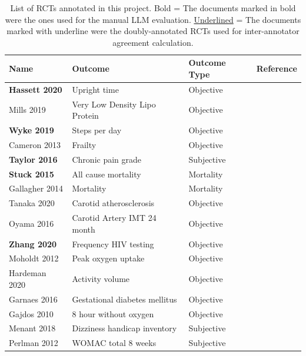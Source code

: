 \documentclass[sn-mathphys,Numbered]{sn-jnl}%
\begin{document}
\begin{longtable}{|p{3cm}|p{3.5cm}|p{3cm}|p{1.7cm}|}
\caption{List of RCTs annotated in this project. Bold = The documents marked in bold were the ones used for the manual LLM evaluation. \underline{Underlined} = The documents marked with underline were the doubly-annotated RCTs used for inter-annotator agreement calculation.}\label{tab1}
\hline
\textbf{Name} & \textbf{Outcome} & \textbf{Outcome Type} & \textbf{Reference} \\
\hline
\endhead %

\hline
\textbf{Hassett 2020} & Upright time & Objective & \cite{hassett2020digitally} \\
\hline
Mills 2019 & Very Low Density Lipo Protein & Objective & \cite{mills2019effect} \\
\hline
\textbf{Wyke 2019} & Steps per day & Objective & \cite{wyke2019effect} \\
\hline
Cameron 2013 & Frailty & Objective & \cite{cameron2013multifactorial} \\
\hline
\textbf{Taylor 2016} & Chronic pain grade & Subjective & \cite{taylor2016novel} \\
\hline
\textbf{Stuck 2015} & All cause mortality & Mortality & \cite{stuck2015effect} \\
\hline
Gallagher 2014 & Mortality & Mortality & \cite{gallagher2014long} \\
\hline
Tanaka 2020 & Carotid atherosclerosis & Objective & \cite{tanaka2020febuxostat} \\
\hline
Oyama 2016 & Carotid Artery IMT 24 month & Objective & \cite{oyama2016effect} \\
\hline
\textbf{Zhang 2020} & Frequency HIV testing & Objective & \cite{zhang2020impact} \\
\hline
Moholdt 2012 & Peak oxygen uptake & Objective & \cite{moholdt2012home} \\
\hline
Hardeman 2020 & Activity volume & Objective & \cite{hardeman2020evaluation} \\
\hline
Garnaes 2016 & Gestational diabetes mellitus & Objective & \cite{garnaes2016exercise} \\
\hline
Gajdos 2010 & 8 hour without oxygen & Objective & \cite{gajdos2010effectiveness} \\
\hline
Menant 2018 & Dizziness handicap inventory & Subjective & \cite{menant2018reducing} \\
\hline
Perlman 2012 & WOMAC total 8 weeks & Subjective & \cite{perlman2012massage} \\

\end{longtable}
\end{document}
